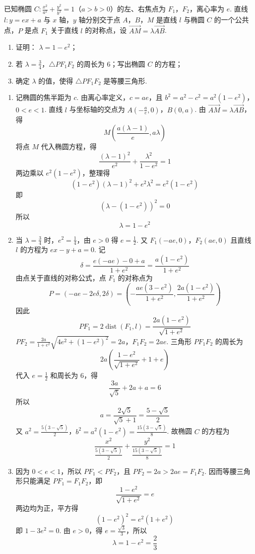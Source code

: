 \begin{problem}
已知椭圆 \(C: \frac{x^2}{a^2} + \frac{y^2}{b^2} = 1\)（\(a > b > 0\)）的左、右焦点为 \(F_1\)，\(F_2\)，离心率为 \(e\). 直线 \(l: y = ex + a\) 与 \(x\) 轴，\(y\) 轴分别交于点 \(A\)，\(B\)，\(M\) 是直线 \(l\) 与椭圆 \(C\) 的一个公共点，\(P\) 是点 \(F_1\) 关于直线 \(l\) 的对称点，设 \(\overrightarrow{AM} = \lambda \overrightarrow{AB}\).

\begin{enumerate}
\item 证明： \( \lambda = 1 - e^{2} \)；
\item 若 \(\lambda = \frac{3}{4}\)，\(\triangle PF_{1}F_{2}\) 的周长为 \(6\)；写出椭圆 \(C\) 的方程；
\item 确定 \( \lambda \) 的值，使得 \( \triangle PF_{1}F_{2} \) 是等腰三角形.
\end{enumerate}

\begin{solution}
\begin{enumerate}
\item 记椭圆的焦半距为 \(c\). 由离心率定义，\(c=ae\)，且
\(b^2=a^2-c^2=a^2(1-e^2)\)，\(0<e<1\).
直线 \(l\) 与坐标轴的交点为
\(A\left(-\frac{a}{e},0\right)\)，\(B(0,a)\).
由 \(\overrightarrow{AM}=\lambda\overrightarrow{AB}\)，得
\[
M\left(\frac{a(\lambda-1)}{e},a\lambda\right)
\]
将点 \(M\) 代入椭圆方程，得
\[
\frac{(\lambda-1)^2}{e^2}+\frac{\lambda^2}{1-e^2}=1
\]
两边乘以 \(e^2(1-e^2)\)，整理得
\[
(1-e^2)(\lambda-1)^2+e^2\lambda^2=e^2(1-e^2)
\]
即
\[
\left(\lambda-(1-e^2)\right)^2=0
\]
所以
\[
\lambda=1-e^2
\]

\item 当 \(\lambda=\frac34\) 时，\(e^2=\frac14\)，由 \(e>0\) 得 \(e=\frac12\). 又
\(F_1(-ae,0)\)，\(F_2(ae,0)\)
且直线 \(l\) 的方程为 \(ex-y+a=0\). 记
\[
\delta=\frac{e(-ae)-0+a}{1+e^2}=\frac{a(1-e^2)}{1+e^2}
\]
由点关于直线的对称公式，点 \(F_1\) 的对称点为
\[
P=\left(-ae-2e\delta,2\delta\right)
=\left(-\frac{ae(3-e^2)}{1+e^2},\frac{2a(1-e^2)}{1+e^2}\right)
\]
因此
\[
PF_1=2\operatorname{dist}(F_1,l)=\frac{2a(1-e^2)}{\sqrt{1+e^2}}
\]
\(PF_2=\frac{2a}{1+e^2}\sqrt{4e^2+(1-e^2)^2}=2a\)，\(F_1F_2=2ae\).
三角形 \(PF_1F_2\) 的周长为
\[
2a\left(\frac{1-e^2}{\sqrt{1+e^2}}+1+e\right)
\]
代入 \(e=\frac12\) 和周长为 \(6\)，得
\[
\frac{3a}{\sqrt5}+2a+a=6
\]
所以
\[
a=\frac{2\sqrt5}{\sqrt5+1}=\frac{5-\sqrt5}{2}
\]
又
\(a^2=\frac{5(3-\sqrt5)}{2}\)，\(b^2=a^2(1-e^2)=\frac{15(3-\sqrt5)}{8}\).
故椭圆 \(C\) 的方程为
\[
\frac{x^2}{\frac{5(3-\sqrt5)}{2}}+\frac{y^2}{\frac{15(3-\sqrt5)}{8}}=1
\]
\item 因为 \(0<e<1\)，所以 \(PF_1<PF_2\)，且 \(PF_2=2a>2ae=F_1F_2\). 因而等腰三角形只能满足 \(PF_1=F_1F_2\)，即
\[
\frac{1-e^2}{\sqrt{1+e^2}}=e
\]
两边均为正，平方得
\[
(1-e^2)^2=e^2(1+e^2)
\]
即 \(1-3e^2=0\). 由 \(e>0\)，得 \(e=\frac{\sqrt3}{3}\)，所以
\[
\lambda=1-e^2=\frac23
\]
\end{enumerate}
\end{solution}
\end{problem}
